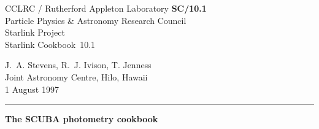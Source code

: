 \documentclass[twoside,11pt,fleqn]{article}
\newcommand{\stardoccategory}  {Starlink Cookbook}
\newcommand{\stardocinitials}  {SC}
\newcommand{\stardocnumber}    {10.1}
\newcommand{\stardocauthors}   {J.~A. Stevens, R.~J. Ivison, T. Jenness\\
                                Joint Astronomy Centre, Hilo, Hawaii}
\newcommand{\stardocdate}      {1 August 1997}
\newcommand{\stardoctitle}     {The SCUBA photometry cookbook}
\newcommand{\stardocversion}   {\ }
\newcommand{\stardocmanual}    {\ }
\newcommand{\stardocname}{\stardocinitials /\stardocnumber}
\newenvironment{latexonly}{}{}
\begin{document}
\thispagestyle{empty}

\begin{latexonly}
   CCLRC / {\sc Rutherford Appleton Laboratory} \hfill {\bf \stardocname}\\
   {\large Particle Physics \& Astronomy Research Council}\\
   {\large Starlink Project\\}
   {\large \stardoccategory\ \stardocnumber}
   \begin{flushright}
   \stardocauthors\\
   \stardocdate
   \end{flushright}
   \vspace{-4mm}
   \rule{\textwidth}{0.5mm}
   \vspace{5mm}
   \begin{center}

   {\Huge\bf  \stardoctitle \\ [2.5ex]}
   {\LARGE\bf \stardocversion \\ [4ex]}
   {\Huge\bf  \stardocmanual}
   \end{center}
   \vspace{5mm}

\end{latexonly}
\end{document}
